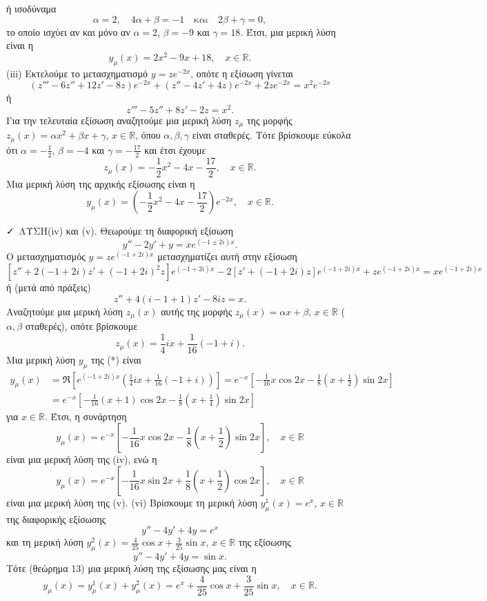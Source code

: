 \documentclass[11pt,a4paper,twoside]{book}
\newcommand{\titlefont}[1]{{\fontfamily{maksf}\selectfont #1}}
\newcommand{\lysh}{\textcolor{cyan!80!black}{\titlefont{\faCheck\ ΛΥΣΗ}}}
\begin{document}
ή ισοδύναμα
\[
    \alpha=2, \quad 4\alpha+\beta=-1 \quad \text{και} \quad 2\beta+\gamma=0,
\]
το οποίο ισχύει αν και μόνο αν $\alpha=2$, $\beta=-9$ και $\gamma=18$. Έτσι, μια μερική λύση είναι η
\[
    y_\mu(x)=2x^2-9x+18, \quad x\in\mathbb{R}.
\]
(iii) Εκτελούμε το μετασχηματισμό $y=ze^{-2x}$, οπότε η εξίσωση
γίνεται
\[
    (z'''-6z''+12z'-8z)e^{-2x}+(z''-4z'+4z)e^{-2x}+2ze^{-2x}=x^2e^{-2x}
\]
ή
\[
    z'''-5z''+8z'-2z=x^2.
\]
Για την τελευταία εξίσωση αναζητούμε μια μερική λύση $z_\mu$ της μορφής $z_\mu(x)=\alpha x^2+\beta x+\gamma$, $x\in\mathbb{R}$, όπου $\alpha,\beta,\gamma$ είναι σταθερές. Τότε βρίσκουμε εύκολα ότι $\alpha=-\frac{1}{2}$, $\beta=-4$ και $\gamma=-\frac{17}{2}$ και έτσι έχουμε
\[
    z_\mu(x)=-\frac{1}{2}x^2-4x-\frac{17}{2}, \quad x\in\mathbb{R}.
\]
Μια μερική λύση της αρχικής εξίσωσης είναι η
\[
    y_\mu(x)=\left(-\frac{1}{2}x^2-4x-\frac{17}{2}\right)e^{-2x}, \quad x\in\mathbb{R}.
\]

\lysh (iv) και (v). Θεωρούμε τη διαφορική εξίσωση
\begin{equation*}
    y''-2y'+y=xe^{(-1\pm2i)x}. \tag{*}
\end{equation*}
Ο μετασχηματισμός $y=ze^{(-1+2i)x}$ μετασχηματίζει αυτή στην εξίσωση
\[
    [z''+2(-1+2i)z'+(-1+2i)^2z]e^{(-1+2i)x}-2[z'+(-1+2i)z]e^{(-1+2i)x}+ze^{(-1+2i)x}=xe^{(-1+2i)x}
\]
ή (μετά από πράξεις)
\[
    z''+4(i-1+1)z'-8iz=x.
\]
Αναζητούμε μια μερική λύση $z_\mu(x)$ αυτής της μορφής $z_\mu(x)=\alpha x+\beta$, $x\in\mathbb{R}$ ($\alpha,\beta$ σταθερές), οπότε βρίσκουμε
\[
    z_\mu(x)=\frac{1}{4}ix+\frac{1}{16}(-1+i).
\]
Μια μερική λύση $y_\mu$ της (*) είναι
\begin{align*}
    y_\mu(x) &= \Re\left[e^{(-1+2i)x}\left(\frac{1}{4}ix+\frac{1}{16}(-1+i)\right)\right] = e^{-x}\left[-\frac{1}{16}x\cos 2x-\frac{1}{8}\left(x+\frac{1}{2}\right)\sin 2x\right] \\
    &= e^{-x}\left[-\frac{1}{16}(x+1)\cos 2x-\frac{1}{8}\left(x+\frac{1}{4}\right)\sin 2x\right]
\end{align*}
για $x\in\mathbb{R}$. Έτσι, η συνάρτηση
\[
    y_\mu(x)=e^{-x}\left[-\frac{1}{16}x\cos 2x-\frac{1}{8}\left(x+\frac{1}{2}\right)\sin 2x\right], \quad x\in\mathbb{R}
\]
είναι μια μερική λύση της (iv), ενώ η
\[
    y_\mu(x)=e^{-x}\left[-\frac{1}{16}x\sin 2x+\frac{1}{8}\left(x+\frac{1}{2}\right)\cos 2x\right], \quad x\in\mathbb{R}
\]
είναι μια μερική λύση της (v).
(vi) Βρίσκουμε τη μερική λύση $y_\mu^1(x)=e^x$, $x\in\mathbb{R}$ της διαφορικής εξίσωσης
\[
    y''-4y'+4y=e^x
\]
και τη μερική λύση $y_\mu^2(x)=\frac{4}{25}\cos x+\frac{3}{25}\sin x$, $x\in\mathbb{R}$ της εξίσωσης
\[
    y''-4y'+4y=\sin x.
\]
Τότε (θεώρημα 13) μια μερική λύση της εξίσωσης μας είναι η
\[
    y_\mu(x)=y_\mu^1(x)+y_\mu^2(x)=e^x+\frac{4}{25}\cos x+\frac{3}{25}\sin x, \quad x\in\mathbb{R}.
\]
\end{document}
